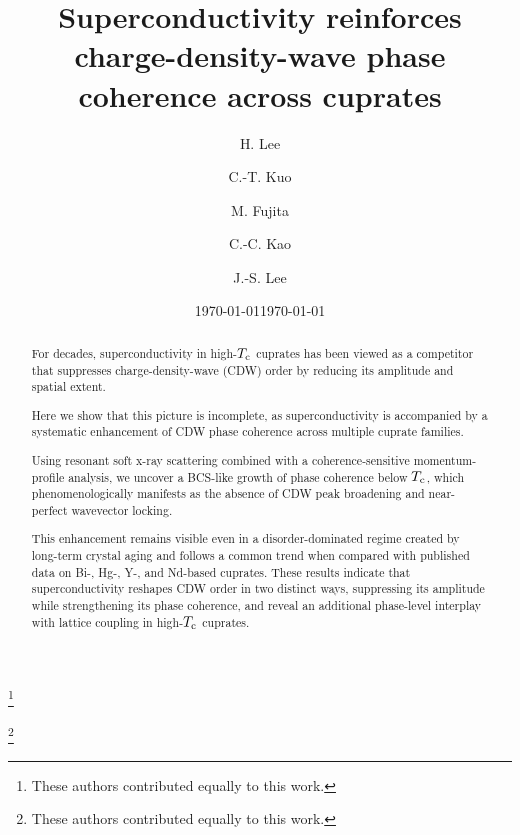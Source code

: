 \documentclass[floatfix,aps,twocolumn,preprintnumbers,superscriptaddress,floatfix,prl]{revtex4-2}
\begin{document}
\title{Superconductivity reinforces charge-density-wave phase coherence across cuprates}

\author{H. Lee}\thanks{These authors contributed equally to this work.}
\author{C.-T. Kuo}\thanks{These authors contributed equally to this work.}
\author{M. Fujita}
\author{C.-C. Kao}
\author{J.-S. Lee}


\date{\today}


\begin{abstract}
For decades, superconductivity in high-$T_{\rm c}$ cuprates has been viewed as a competitor that suppresses charge-density-wave (CDW) order by reducing its amplitude and spatial extent.

Here we show that this picture is incomplete, as superconductivity is accompanied by a systematic enhancement of CDW phase coherence across multiple cuprate families.

Using resonant soft x-ray scattering combined with a coherence-sensitive momentum-profile analysis, we uncover a BCS-like growth of phase coherence below $T_{\rm c}$, which phenomenologically manifests as the absence of CDW peak broadening and near-perfect wavevector locking.

This enhancement remains visible even in a disorder-dominated regime created by long-term crystal aging and follows a common trend when compared with published data on Bi-, Hg-, Y-, and Nd-based cuprates. These results indicate that superconductivity reshapes CDW order in two distinct ways, suppressing its amplitude while strengthening its phase coherence, and reveal an additional phase-level interplay with lattice coupling in high-$T_{\rm c}$ cuprates.
\end{abstract}

\date{\today}
\maketitle
\end{document}
